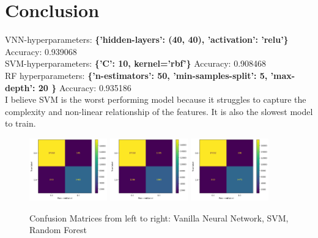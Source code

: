 \documentclass{article}
\begin{document}
\section{Conclusion}
VNN-hyperparameters: \textbf{\{'hidden-layers': (40, 40), 'activation': 'relu'\}}  Accuracy: 0.939068 \\
SVM-hyperparameters: \textbf{\{'C': 10, kernel='rbf'\}} Accuracy: 0.908468 \\
RF hyperparameters: \textbf{\{'n-estimators': 50, 'min-samples-split': 5, 'max-depth': 20 \}} Accuracy: 0.935186 \\
I believe SVM is the worst performing
model because it struggles to capture the complexity and non-linear relationship
 of the features. It is also the slowest model to train. \\  
\begin{figure}[hbp]
	\caption{Confusion Matrices from left to right: Vanilla Neural Network, SVM, Random Forest}
	\includegraphics[width=0.3\textwidth]{vnn_confusion_matrix.png}
	\includegraphics[width=0.3\textwidth]{svm_confusion_matrix.png}
	\includegraphics[width=0.3\textwidth]{rf_confusion_matrix.png}
\end{figure}
\end{document}
